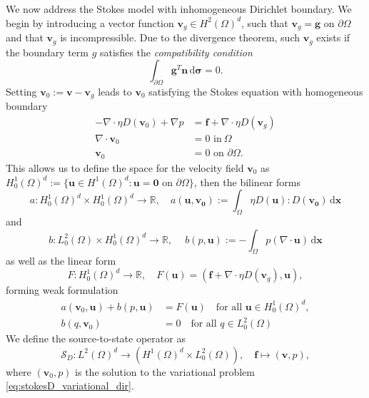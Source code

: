 \documentclass[final,leqno]{scrarticle}
\newcommand{\RR}{\mathbb{R}}
\newcommand{\calS}{\mathcal{S}}
\newcommand{\Hd}{{H^1(\Omega)^d}}
\newcommand{\Hdz}{H^1_0(\Omega)^d}
\newcommand{\dd}{\, \mathrm{d}}
\begin{document}
We now address the Stokes model with inhomogeneous Dirichlet boundary. We begin by introducing a vector function $\mathbf{v}_g \in H^2(\Omega)^d$, such that $\mathbf{v}_g=\mathbf{g}$ on $\partial \Omega$ and that $\mathbf{v}_g$ is incompressible.
Due to the divergence theorem, such $\mathbf{v}_g$ exists if the boundary term $g$ satisfies the \emph{compatibility condition}
\begin{equation}\label{eq:compatibility}
    \int_{\partial \Omega} \mathbf{g}^T \mathbf{n} \dd \boldsymbol{\sigma} = 0 .
\end{equation}
Setting $\mathbf{v}_0:=\mathbf{v}-\mathbf{v}_g$ leads to $\mathbf{v}_0$  satisfying the Stokes equation with homogeneous  boundary
\begin{equation}\label{eq:stokesD_variational_dir}
\begin{split} 
- \nabla \cdot \eta D(\mathbf{v}_0) + \nabla p & 
= \mathbf{f} + \nabla \cdot \eta D(\mathbf{v}_g)\\
 \nabla \cdot  \mathbf{v}_0 &= 0  \text{ in} \ \Omega  \\
\mathbf{v}_0 &=0  \text{ on }  \partial \Omega. 
   \end{split}
\end{equation}
This allows us to define the space for the velocity field $\mathbf{v}_0$ as \\$\Hdz := \lbrace \mathbf{u}\in\Hd : \mathbf{u} = \mathbf{0} \text{ on } \partial \Omega \rbrace$, then the bilinear forms 
\begin{displaymath}
        a:  \Hdz \times \Hdz \to \RR, \quad
    a(\mathbf{u},\mathbf{v_0}) :=  \int_{\Omega} \eta D(\mathbf{u}) : D(\mathbf{v_0}) \dd \mathbf{x}  
\end{displaymath}
and 
\begin{displaymath}
     b:  L^2_0(\Omega) \times \Hdz  \to \RR, \quad \ b(p,\mathbf{u}) := - \int_{\Omega} p (\nabla \cdot\mathbf{u}) \dd \mathbf{x}
\end{displaymath}
as well as the linear form 
\begin{displaymath}
    F: \Hdz \rightarrow \RR,\quad   F(\mathbf{u}) = (\mathbf{f} +\nabla \cdot \eta D(\mathbf{v}_g), \mathbf{u}),
\end{displaymath}
forming weak formulation %
\begin{displaymath} \label{eq:stokes_problem_variational_dir}
 \begin{split}
  a(\mathbf{v}_0,\mathbf{u}) + b(p,\mathbf{u}) &= F(\mathbf{u}) \quad \text{for all } \mathbf{u} \in \Hdz, \\
  b(q,\mathbf{v}_0) &= 0 \quad \text{for all } q \in L^2_0(\Omega)
 \end{split}
\end{displaymath}
We define the source-to-state operator %
as
\begin{displaymath}
    \label{eq:S_D}
     \calS_D : L^2(\Omega)^d \to \left( \Hd \times L_0^2(\Omega) \right),\quad \mathbf{f} \mapsto (\mathbf{v},p) ,
\end{displaymath}
 where $(\mathbf{v}_0,p)$ is the  solution to the variational problem \eqref{eq:stokesD_variational_dir}.
\end{document}
